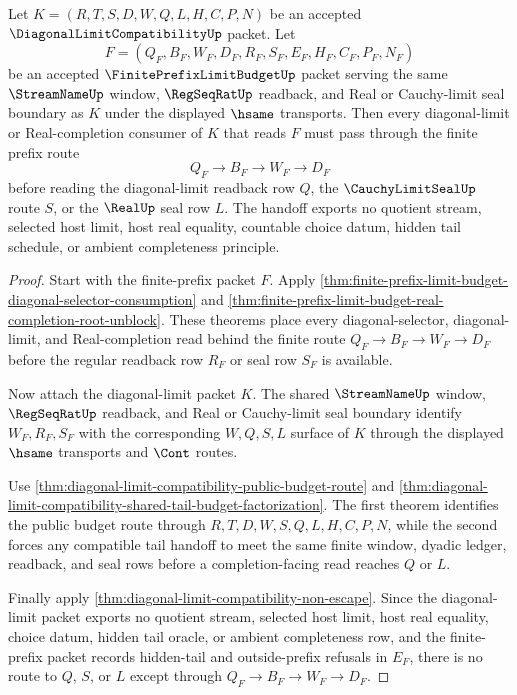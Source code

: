 \begin{theorem}
\label{thm:diagonal-limit-compatibility-finite-prefix-budget-handoff}
Let $K=(R,T,S,D,W,Q,L,H,C,P,N)$ be an accepted
$\DiagonalLimitCompatibilityUp$ packet. Let
$$
F=(Q_F,B_F,W_F,D_F,R_F,S_F,E_F,H_F,C_F,P_F,N_F)
$$
be an accepted $\FinitePrefixLimitBudgetUp$ packet serving the same
$\StreamNameUp$ window, $\RegSeqRatUp$ readback, and Real or Cauchy-limit seal
boundary as $K$ under the displayed $\hsame$ transports. Then every
diagonal-limit or Real-completion consumer of $K$ that reads $F$ must pass
through the finite prefix route
$$
Q_F \to B_F \to W_F \to D_F
$$
before reading the diagonal-limit readback row $Q$, the $\CauchyLimitSealUp$
route $S$, or the $\RealUp$ seal row $L$. The handoff exports no quotient
stream, selected host limit, host real equality, countable choice datum, hidden
tail schedule, or ambient completeness principle.
\end{theorem}
\begin{proof}
Start with the finite-prefix packet $F$. Apply
\autoref{thm:finite-prefix-limit-budget-diagonal-selector-consumption} and
\autoref{thm:finite-prefix-limit-budget-real-completion-root-unblock}. These
theorems place every diagonal-selector, diagonal-limit, and Real-completion
read behind the finite route $Q_F \to B_F \to W_F \to D_F$ before the regular
readback row $R_F$ or seal row $S_F$ is available.

Now attach the diagonal-limit packet $K$. The shared $\StreamNameUp$ window,
$\RegSeqRatUp$ readback, and Real or Cauchy-limit seal boundary identify
$W_F,R_F,S_F$ with the corresponding $W,Q,S,L$ surface of $K$ through the
displayed $\hsame$ transports and $\Cont$ routes.

Use \autoref{thm:diagonal-limit-compatibility-public-budget-route} and
\autoref{thm:diagonal-limit-compatibility-shared-tail-budget-factorization}.
The first theorem identifies the public budget route through
$R,T,D,W,S,Q,L,H,C,P,N$, while the second forces any compatible tail handoff to
meet the same finite window, dyadic ledger, readback, and seal rows before a
completion-facing read reaches $Q$ or $L$.

Finally apply \autoref{thm:diagonal-limit-compatibility-non-escape}. Since the
diagonal-limit packet exports no quotient stream, selected host limit, host
real equality, choice datum, hidden tail oracle, or ambient completeness row,
and the finite-prefix packet records hidden-tail and outside-prefix refusals in
$E_F$, there is no route to $Q$, $S$, or $L$ except through
$Q_F \to B_F \to W_F \to D_F$.
\end{proof}


